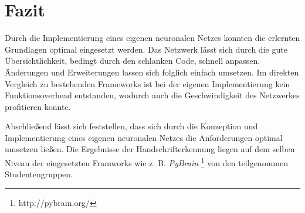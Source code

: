 \section{Fazit}
Durch die Implementierung eines eigenen neuronalen Netzes konnten die erlernten Grundlagen optimal eingesetzt werden. Das Netzwerk lässt sich durch die gute Übersichtlichkeit, bedingt durch den schlanken Code, schnell anpassen. Änderungen und Erweiterungen lassen sich folglich einfach umsetzen. Im direkten Vergleich zu bestehenden Frameworks ist bei der eigenen Implementierung kein Funktionsoverhead entstanden, wodurch auch die Geschwindigkeit des Netzwerkes profitieren konnte. 

Abschließend lässt sich feststellen, dass sich durch die Konzeption und Implementierung eines eigenen neuronalen Netzes die Anforderungen  optimal umsetzen ließen. Die Ergebnisse der Handschrifterkennung liegen auf dem selben Niveau der eingesetzten Framworks wie z. B. \emph{PyBrain} \footnote{http://pybrain.org/} von den teilgenommen Studentengruppen. 